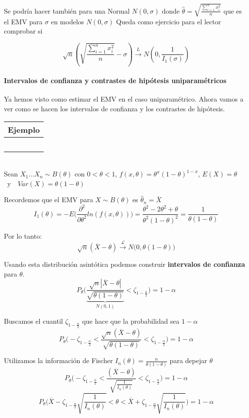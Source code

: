 Se podría hacer también para una Normal $N(0,\sigma)$ donde $\widehat{\theta}=\sqrt{\frac{\sum_{i=1}^{n}x^2_i}{n}}$ que es el EMV para $\sigma$ en modelos $N(0,\sigma)$
Queda como ejercicio para el lector comprobar si

\[
    \sqrt{n}\left(\sqrt{\frac{\sum_{i=1}^{n}x^2_i}{n}}-\sigma\right)\overset{L}{\to}N\left(0,\frac{1}{I_1(\sigma)}\right)
\]
\newpage
\paragraph{Intervalos de confianza y contrastes de hipótesis uniparamétricos}

Ya hemos visto como estimar el EMV en el caso uniparamétrico. Ahora vamos a ver como se hacen los intervalos de confianza y los contrastes de hipótesis.

\hspace{-1cm}\noindent\begin{tabular}{r}
    \textbf{Ejemplo}  \\ \hline \ \\
\end{tabular}\\
Sean $X_1\dots X_n\sim B(\theta)$ con $0<\theta < 1$, $f(x,\theta)=\theta^x(1-\theta)^{1-x}$, $E(X)=\theta$\ y\ \ $Var(X)=\theta(1-\theta)$

Recordemos que el EMV para $X\sim B(\theta)$ es $\widehat\theta_n=\overline{X}$
$$I_1(\theta)=-E\Big(\frac{\partial^2}{\partial\theta^2}ln(f(x,\theta))\Big)=\frac{\theta^2-2\theta^2+\theta}{\theta^2(1-\theta)^2}=\frac{1}{\theta(1-\theta)}$$

Por lo tanto: 
$$\sqrt{n}(\overline{X}-\theta)\overset{\mathcal{L}}{\longrightarrow}N\big(0,\theta(1-\theta)\big)$$

Usando esta distribución asintótica podemos construir \textbf{intervalos de confianza} para $\theta$.
$$P_\theta\Bigg(\underbrace{\frac{\sqrt{n}|\overline{X}-\theta|}{\sqrt{\theta(1-\theta)}}}_{N(0,1)}<\zeta_{1-\frac{\alpha}{2}}\Bigg)=1-\alpha$$

Buscamos el cuantil $\zeta_{1-\frac{\alpha}{2}}$ que hace que la probabilidad sea $1-\alpha$
$$P_\theta\Bigg(-\zeta_{1-\frac{\alpha}{2}}<\frac{\sqrt{n}(\overline{X}-\theta)}{\sqrt{\theta(1-\theta)}}<\zeta_{1-\frac{\alpha}{2}}\Bigg)=1-\alpha$$

Utilizamos la información de Fischer $I_n(\theta)=\frac{n}{\theta(1-\theta)}$ para depejar $\theta$
$$P_\theta\Bigg(-\zeta_{1-\frac{\alpha}{2}}<\frac{(\overline{X}-\theta)}{\sqrt{\frac{1}{I_n(\theta)}}}<\zeta_{1-\frac{\alpha}{2}}\Bigg)=1-\alpha$$
$$P_\theta\Bigg(\overline{X}-\zeta_{1-\frac{\alpha}{2}}\sqrt{\frac{1}{I_n(\theta)}}<\theta<\overline{X}+\zeta_{1-\frac{\alpha}{2}}\sqrt{\frac{1}{I_n(\theta)}}\Bigg)=1-\alpha$$

